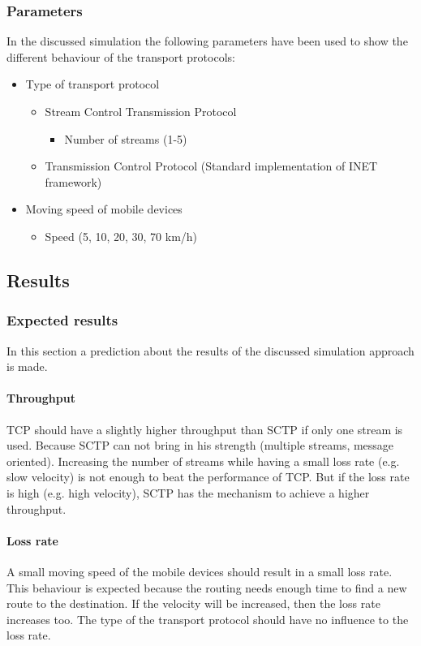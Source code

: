 \documentclass[a4paper]{article}
\begin{document}
\subsubsection{Parameters}
In the discussed simulation the following parameters have been used to show the different behaviour of the transport protocols:
\begin{itemize}
	\item Type of transport protocol
	\begin{itemize}
		\item Stream Control Transmission Protocol
		\begin{itemize}
			\item Number of streams (1-5)
		\end{itemize}
    	\item Transmission Control Protocol (Standard implementation of INET framework)
	\end{itemize}
	\item Moving speed of mobile devices
	\begin{itemize}
		\item Speed (5, 10, 20, 30, 70 km/h)
	\end{itemize}
\end{itemize}	

\subsection{Results}
\subsubsection{Expected results}
In this section a prediction about the results of the discussed simulation approach is made.

\paragraph{Throughput}
TCP should have a slightly higher throughput than SCTP if only one stream is used. Because SCTP can not bring in his strength (multiple streams, message oriented). Increasing the number of streams while having a small loss rate (e.g. slow velocity) is not enough to beat the performance of TCP. But if the loss rate is high (e.g. high velocity), SCTP has the mechanism to achieve a higher throughput.
\paragraph{Loss rate}
A small moving speed of the mobile devices should result in a small loss rate. This behaviour is expected because the routing needs enough time to find a new route to the destination. If the velocity will be increased, then the loss rate increases too. The type of the transport protocol should have no influence to the loss rate.
\end{document}
